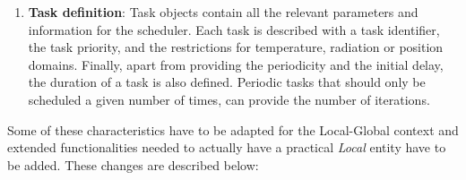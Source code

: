 \begin{enumerate}
\item \textbf{Task definition}: Task objects contain all the relevant parameters and information for the scheduler. Each task is described with a task identifier, the task priority, and the restrictions for temperature, radiation or position domains. Finally, apart from providing the periodicity and the initial delay, the duration of a task is also defined.  Periodic tasks that should only be scheduled a given number of times, can provide the number of iterations.

\end{enumerate}

Some of these characteristics have to be adapted for the Local-Global context and extended functionalities needed to actually have a practical \emph{Local} entity have to be added. These changes are described below:

